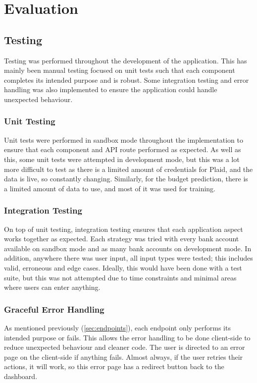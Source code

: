 \chapter{Evaluation}
\label{ch:evaluation}

\section{Testing}
Testing was performed throughout the development of the application. This has mainly been manual testing focused on unit tests such that each component completes its intended purpose and is robust. Some integration testing and error handling was also implemented to ensure the application could handle unexpected behaviour.

\subsection{Unit Testing}
Unit tests were performed in sandbox mode throughout the implementation to ensure that each component and API route performed as expected. As well as this, some unit tests were attempted in development mode, but this was a lot more difficult to test as there is a limited amount of credentials for Plaid, and the data is live, so constantly changing. Similarly, for the budget prediction, there is a limited amount of data to use, and most of it was used for training.

\subsection{Integration Testing}
On top of unit testing, integration testing ensures that each application aspect works together as expected. Each strategy was tried with every bank account available on sandbox mode and as many bank accounts on development mode. In addition, anywhere there was user input, all input types were tested; this includes valid, erroneous and edge cases. Ideally, this would have been done with a test suite, but this was not attempted due to time constraints and minimal areas where users can enter anything.


\subsection{Graceful Error Handling}
As mentioned previously (\ref{sec:endpoints}), each endpoint only performs its intended purpose or fails. This allows the error handling to be done client-side to reduce unexpected behaviour and cleaner code. The user is directed to an error page on the client-side if anything fails. Almost always, if the user retries their actions, it will work, so this error page has a redirect button back to the dashboard.


